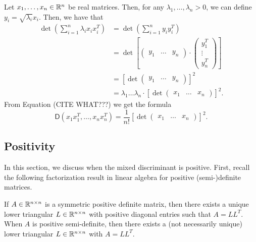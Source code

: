 \documentclass{puthesis-UG}
\begin{document}
\begin{example} \label{mixed-discriminant-calculation-for-rank-1}
	Let $x_1, \ldots, x_n \in \mathbb{R}^n$ be real matrices. Then, for any $\lambda_1, \ldots, \lambda_n > 0$, we can define $y_i = \sqrt{\lambda_i} x_i$. Then, we have that 
	\begin{align*}
		\det \left ( \sum_{i = 1}^n \lambda_i x_i x_i^T \right ) & = \det \left ( \sum_{i = 1}^n y_i y_i^T \right ) \\
		& = \det \left [ \begin{pmatrix} y_1 & \ldots & y_n \end{pmatrix} \cdot \begin{pmatrix} y_1^T \\ \vdots \\ y_n^T \end{pmatrix} \right ]\\
		& = \left [ \det \begin{pmatrix} y_1 & \ldots & y_n \end{pmatrix} \right ]^2 \\
		& = \lambda_1 \ldots \lambda_n \cdot \left [ \det \begin{pmatrix} x_1 & \ldots & x_n \end{pmatrix} \right ]^2.
	\end{align*}
	From Equation (CITE WHAT???) we get the formula 
	\[
		\mathsf{D} (x_1x_1^T, \ldots, x_nx_n^T) = \frac{1}{n!}\left [ \det \begin{pmatrix} x_1 & \ldots & x_n \end{pmatrix} \right ]^2.
	\]
\end{example}



\subsection{Positivity}

In this section, we discuss when the mixed discriminant is positive. First, recall the following factorization result in linear algebra for positive (semi-)definite matrices. 

\begin{thm}  \label{cholesky}
	If $A \in \mathbb{R}^{n \times n}$ is a symmetric positive definite matrix, then there exists a unique lower triangular $L \in \mathbb{R}^{n \times n}$ with positive diagonal entries such that $A = LL^T$. When $A$ is positive semi-definite, then there exists a (not necessarily unique) lower triangular $L \in \mathbb{R}^{n \times n}$ with $A = LL^T$. 
\end{thm}
\end{document}
